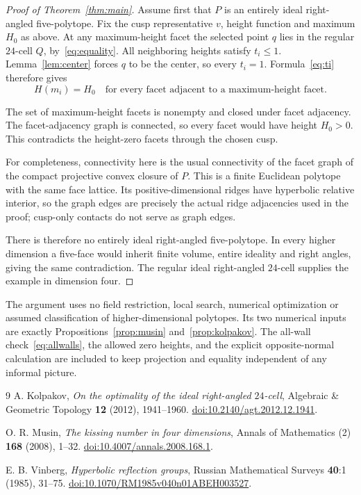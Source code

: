 \documentclass[11pt]{article}
\theoremstyle{remark}
\begin{document}
\begin{proof}[Proof of Theorem~\ref{thm:main}]
Assume first that $P$ is an entirely ideal right-angled five-polytope.
Fix the cusp representative $v$, height function and maximum $H_0$
as above. At any maximum-height facet the selected point $q$ lies
in the regular $24$-cell $Q$, by~\eqref{eq:equality}. All neighboring
heights satisfy $t_i\le1$. Lemma~\ref{lem:center} forces $q$ to be
the center, so every $t_i=1$. Formula~\eqref{eq:ti} therefore gives
\[
 H(m_i)=H_0
 \quad\text{for every facet adjacent to a maximum-height facet.}
\]

The set of maximum-height facets is nonempty and closed under facet
adjacency. The facet-adjacency graph is connected, so every facet
would have height $H_0>0$. This contradicts the height-zero facets
through the chosen cusp.

For completeness, connectivity here is the usual connectivity of
the facet graph of the compact projective convex closure of $P$.
This is a finite Euclidean polytope with the same face lattice.
Its positive-dimensional ridges have hyperbolic relative interior,
so the graph edges are precisely the actual ridge adjacencies used
in the proof; cusp-only contacts do not serve as graph edges.

There is therefore no entirely ideal right-angled five-polytope.
In every higher dimension a five-face would inherit finite volume,
entire ideality and right angles, giving the same contradiction.
The regular ideal right-angled $24$-cell supplies the example in
dimension four.
\end{proof}

The argument uses no field restriction, local search, numerical
optimization or assumed classification of higher-dimensional
polytopes. Its two numerical inputs are exactly
Propositions~\ref{prop:musin} and~\ref{prop:kolpakov}. The all-wall
check~\eqref{eq:allwalls}, the allowed zero heights, and the explicit
opposite-normal calculation are included to keep projection and
equality independent of any informal picture.

\begin{thebibliography}{9}
A. Kolpakov, \emph{On the optimality of the ideal right-angled
$24$-cell}, Algebraic \& Geometric Topology \textbf{12} (2012),
1941--1960.
\href{https://doi.org/10.2140/agt.2012.12.1941}{doi:10.2140/agt.2012.12.1941}.

O. R. Musin, \emph{The kissing number in four dimensions}, Annals of
Mathematics (2) \textbf{168} (2008), 1--32.
\href{https://doi.org/10.4007/annals.2008.168.1}{doi:10.4007/annals.2008.168.1}.

E. B. Vinberg, \emph{Hyperbolic reflection groups}, Russian Mathematical
Surveys \textbf{40}:1 (1985), 31--75.
\href{https://doi.org/10.1070/RM1985v040n01ABEH003527}{doi:10.1070/RM1985v040n01ABEH003527}.
\end{thebibliography}
\end{document}
